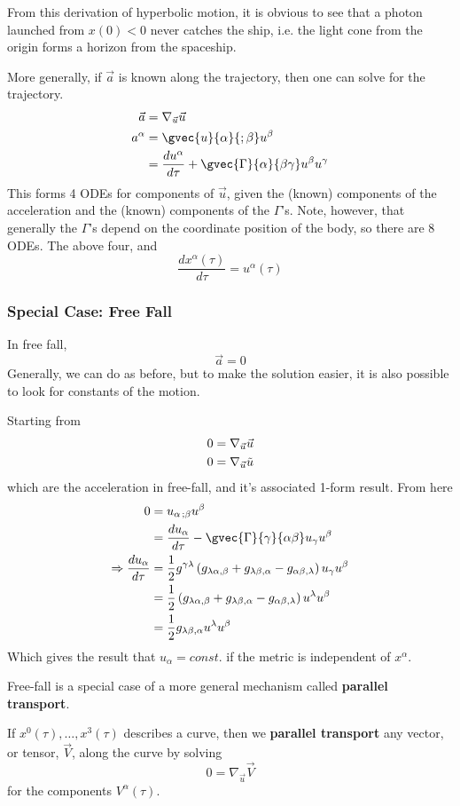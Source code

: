 From this derivation of hyperbolic motion, it is obvious to see that a photon launched from $x(0) < 0$ never catches the ship, i.e. the light cone from the origin forms a horizon from the spaceship. \par More generally, if $\vec{a}$ is known along the trajectory, then one can solve for the trajectory. 
\begin{align*}
    \vec{a} & = \nabla_{\vec{u}} \vec{u} \\
    a^\alpha & = \gvec{u}{\alpha}{; \beta} u^\beta \\
    & = \frac{d u^\alpha}{d\tau} + \gvec{\Gamma}{\alpha}{\beta \gamma} u^\beta u^\gamma
\end{align*}
This forms 4 ODEs for components of $\vec{u}$, given the (known) components of the acceleration and the (known) components of the $\Gamma$'s. Note, however, that generally the $\Gamma$'s depend on the coordinate position of the body, so there are 8 ODEs. The above four, and 
$$ \frac{d x^\alpha(\tau)}{d\tau} = u^\alpha(\tau) $$

\subsubsection{Special Case: Free Fall}
In free fall, 
$$ \vec{a} = 0 $$
Generally, we can do as before, but to make the solution easier, it is also possible to look for constants of the motion. \par Starting from 
\begin{align*}
    0 & = \nabla_{\vec{u}} \vec{u} \\
    0 & = \nabla_{\vec{u}} \Tilde{u}
\end{align*}
which are the acceleration in free-fall, and it's associated 1-form result. From here 
\begin{align*}
    0 &= u_{\alpha \, ; \beta} u^\beta \\
    & = \frac{d u_\alpha}{d\tau} - \gvec{\Gamma}{\gamma}{\alpha\beta} u_\gamma u^\beta \\
    \Rightarrow \frac{d u_\alpha}{d\tau} & = \frac{1}{2} g^{\gamma \lambda} \left(g_{\lambda \alpha, \beta} + g_{\lambda \beta, \alpha} - g_{\alpha \beta, \lambda}\right) u_\gamma u^\beta \\ & = \frac{1}{2} \left(g_{\lambda \alpha, \beta} + g_{\lambda \beta, \alpha} - g_{\alpha \beta, \lambda}\right) u^\lambda u^\beta \\ & = \frac{1}{2}g_{\lambda \beta, \alpha} u^\lambda u^\beta
\end{align*}
Which gives the result that $u_\alpha = const.$ if the metric is independent of $x^\alpha$. \par 
Free-fall is a special case of a more general mechanism called \textbf{parallel transport}. \par
If $x^0(\tau), \dots, x^3(\tau)$ describes a curve, then we \textbf{parallel transport} any vector, or tensor, $\vec{V}$, along the curve by solving 
$$ 0 = \nabla_{\vec{u}} \vec{V} $$
for the components $V^\alpha(\tau)$.



